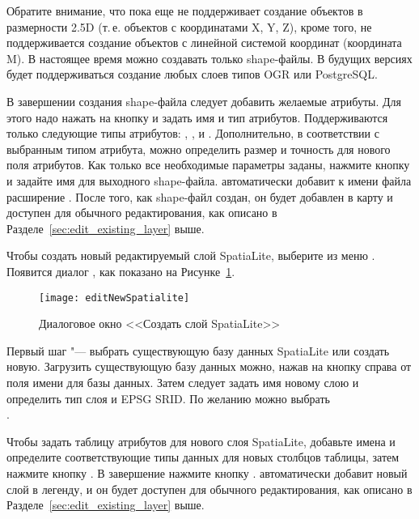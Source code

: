Обратите внимание, что \qg пока еще не поддерживает создание объектов в
размерности 2.5D (т.\,е. объектов с координатами X, Y, Z), кроме того, не
поддерживается создание объектов с линейной системой координат (координата M).
В настоящее время можно создавать только shape-файлы. В будущих
версиях \qg будет поддерживаться создание любых слоев типов OGR или PostgreSQL.

В завершении создания shape-файла следует добавить желаемые атрибуты. Для
этого надо нажать на кнопку   и задать имя и тип атрибутов.
Поддерживаются только следующие типы атрибутов:  ,
, и .
Дополнительно, в соответствии с выбранным типом атрибута, можно определить
размер и точность для нового поля атрибутов. Как только все необходимые
параметры заданы, нажмите кнопку  и задайте имя для выходного
shape-файла. \qg автоматически добавит к имени файла расширение .
После того, как shape-файл создан, он будет добавлен в карту и доступен для
обычного редактирования, как описано в Разделе~\ref{sec:edit_existing_layer} выше.

\label{sec:create spatialite}

Чтобы создать новый редактируемый слой SpatiaLite, выберите 
\arrow {} из меню
. Появится диалог , как
показано на Рисунке~\ref{fig:newspatialitelayer}.

\begin{figure}[ht]
   \centering
   \texttt{[image: editNewSpatialite]}
   \caption{Диалоговое окно <<Создать слой SpatiaLite>> \wincaption}\label{fig:newspatialitelayer}
\end{figure}

Первый шаг "--- выбрать существующую базу данных SpatiaLite или создать
новую. Загрузить существующую базу данных можно, нажав на кнопку 
справа от поля имени для базы данных. Затем следует задать имя новому слою и
определить тип слоя и EPSG SRID. По желанию можно выбрать \\
.

Чтобы задать таблицу атрибутов для нового слоя SpatiaLite, добавьте имена
и определите соответствующие типы данных для новых столбцов таблицы, затем
нажмите кнопку . В завершение нажмите кнопку .
\qg автоматически добавит новый слой в легенду, и он будет доступен для
обычного редактирования, как описано в Разделе~\ref{sec:edit_existing_layer} выше.

